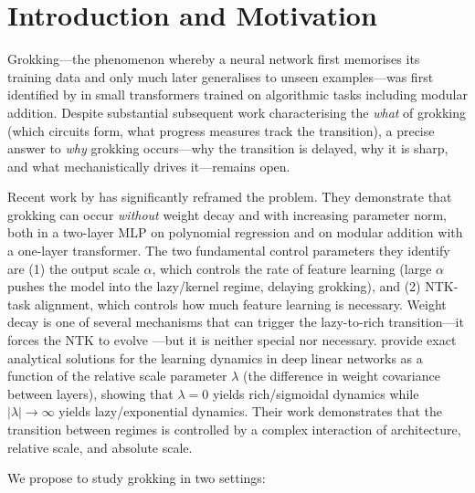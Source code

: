 \documentclass[11pt,a4paper]{article}
\begin{document}
\section{Introduction and Motivation}

Grokking---the phenomenon whereby a neural network first memorises its training data and only much later generalises to unseen examples---was first identified by \citet{power2022grokking} in small transformers trained on algorithmic tasks including modular addition. Despite substantial subsequent work characterising the \emph{what} of grokking (which circuits form, what progress measures track the transition), a precise answer to \emph{why} grokking occurs---why the transition is delayed, why it is sharp, and what mechanistically drives it---remains open.

Recent work by \citet{kumar2024grokking} has significantly reframed the problem. They demonstrate that grokking can occur \emph{without} weight decay and with increasing parameter norm, both in a two-layer MLP on polynomial regression and on modular addition with a one-layer transformer. The two fundamental control parameters they identify are (1) the output scale $\alpha$, which controls the rate of feature learning (large $\alpha$ pushes the model into the lazy/kernel regime, delaying grokking), and (2) NTK-task alignment, which controls how much feature learning is necessary. Weight decay is one of several mechanisms that can trigger the lazy-to-rich transition---it forces the NTK to evolve \citep{lewkowycz2020large}---but it is neither special nor necessary. \citet{domine2025lazy} provide exact analytical solutions for the learning dynamics in deep linear networks as a function of the relative scale parameter $\lambda$ (the difference in weight covariance between layers), showing that $\lambda = 0$ yields rich/sigmoidal dynamics while $|\lambda| \to \infty$ yields lazy/exponential dynamics. Their work demonstrates that the transition between regimes is controlled by a complex interaction of architecture, relative scale, and absolute scale.

We propose to study grokking in two settings:
\end{document}
